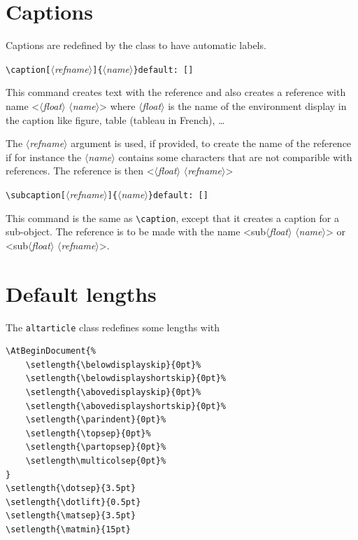 \documentclass[12pt, babellanguage=british, titlespace, defaulttheorems]{altarticle}
\newcommand{\aargt}[1]{\ensuremath{\langle}\textrm{{\emph{#1}}}\ensuremath{\rangle}}
\newcommand{\argt}[1]{\texttt{\{}\ensuremath{\langle}\textrm{{\emph{#1}}}\ensuremath{\rangle}\texttt{\}}}
\newcommand{\optargt}[1]{\texttt{[}\ensuremath{\langle}\textrm{\emph{#1}}\ensuremath{\rangle}\texttt{]}}
\newcommand{\commandline}[1][]{\def\argI{#1}\ccommandline}
\newcommand{\ccommandline}[2][]{\par\medskip\hspace*{-.75cm}\texttt{\textbackslash#2}\argI{}\hfill\if\relax\detokenize{#1}\relax\else\texttt{default:~#1}\fi\par}
\begin{document}
\section{Captions}
Captions are redefined by the class to have automatic labels.
\commandline[\optargt{refname}\argt{name}][{[]}]{caption}This command creates text with the reference and also creates a reference with name <\aargt{float} \aargt{name}> where \aargt{float} is the name of the environment display in the caption like figure, table (tableau in French), \dots

The \aargt{refname} argument is used, if provided, to create the name of the reference if for instance the \aargt{name} contains some characters that are not comparible with references. The reference is then <\aargt{float} \aargt{refname}>
\commandline[\optargt{refname}\argt{name}][{[]}]{subcaption}This command is the same as \texttt{\textbackslash caption}, except that it creates a caption for a sub-object. The reference is to be made with the name <sub\aargt{float} \aargt{name}> or <sub\aargt{float} \aargt{refname}>.
\section{Default lengths}
The \texttt{altarticle} class redefines some lengths with
\begin{verbatim}
\AtBeginDocument{%
    \setlength{\belowdisplayskip}{0pt}%
    \setlength{\belowdisplayshortskip}{0pt}%
    \setlength{\abovedisplayskip}{0pt}%
    \setlength{\abovedisplayshortskip}{0pt}%
    \setlength{\parindent}{0pt}%
    \setlength{\topsep}{0pt}%
    \setlength{\partopsep}{0pt}%
    \setlength\multicolsep{0pt}%
}
\setlength{\dotsep}{3.5pt}
\setlength{\dotlift}{0.5pt}
\setlength{\matsep}{3.5pt}
\setlength{\matmin}{15pt}
\end{verbatim}
\end{document}

